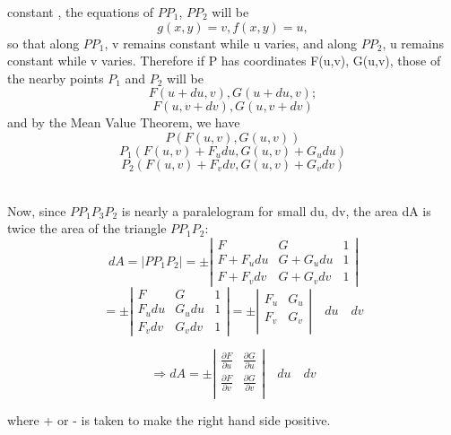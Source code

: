 \documentclass[11pt]{amsbook}
\begin{document}

    constant , the equations of \(PP_1\), \(PP_2\) will be 
    \[ g(x,y) = v , f(x,y) = u, \]
    so that along \(PP_1\), v remains constant while u varies, and along \(PP_2\), u remains constant while v varies. Therefore if P has coordinates F(u,v), G(u,v), those of the nearby points \(P_1\) and \(P_2\) will be
        \[ F(u + du, v), G(u + du, v); \]
        \[ F(u, v + dv), G(u, v + dv) \]
    and by the Mean Value Theorem, we have 
     \[ P(F(u, v), G(u, v)) \]
     \[ P_1(F(u, v) + F_u du, G(u, v) + G_u du) \]
     \[ P_2(F(u, v) + F_v dv, G(u, v) + G_v dv) \]

    \\ Now, since \(PP_1P_3P_2\) is nearly a paralelogram for small du, dv, the area dA is twice the area of the triangle \(PP_1P_2\):
    \[ dA = \left| PP_1P_2 \right| = \pm \left| \begin{array}{ccc}
        F & G & 1\\
        F + F_u du & G + G_u du & 1 \\
        F + F_v dv & G + G_v dv & 1 \end{array} \right|\]
    \[ = \pm \left| \begin{array}{ccc}
        F & G & 1\\
        F_u du & G_u du & 1 \\
        F_v dv & G_v dv & 1 \end{array} \right| = \pm \left| \begin{array}{cc}
        F_u & G_u\\
        F_v& G_v\\ \end{array} \right| \quad du \quad dv \]
        
    \[\Rightarrow dA = \pm \left| \begin{array}{cc}
        \frac{\partial F}{\partial u} & \frac{\partial G}{\partial u}\\[0.5em]
        \frac{\partial F}{\partial v} & \frac{\partial G}{\partial v}\\ \end{array} \right| \quad du \quad dv\]
    
    where + or - is taken to make the right hand side positive.
    
\end{document}
